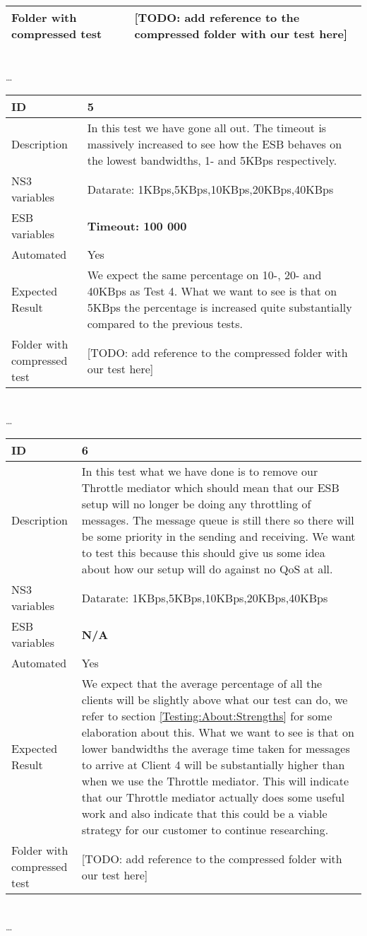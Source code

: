 \begin{center}
\begin{tabular}{| p{4cm} | p{8cm} |}
\hline
Folder with compressed test & [TODO: add reference to the compressed folder with our test here]\\
\hline
\end{tabular}
\\ \ldots \\
\begin{tabular}{| p{4cm} | p{8cm} |}%
\hline
ID & 5 \\
\hline
Description & In this test we have gone all out. The timeout is massively increased to see how the ESB behaves on the lowest bandwidths, 1- and 5KBps respectively.  \\
\hline
NS3 variables & Datarate: 1KBps,5KBps,10KBps,20KBps,40KBps \\
\hline
ESB variables & \textbf{Timeout: 100 000} \\
\hline
Automated & Yes \\
\hline
Expected Result & We expect the same percentage on 10-, 20- and 40KBps as Test 4. What we want to see is that on 5KBps the percentage is increased quite substantially compared to the previous tests. \\
\hline
Folder with compressed test & [TODO: add reference to the compressed folder with our test here]\\
\hline
\end{tabular}
\\ \ldots \\
\begin{tabular}{| p{4cm} | p{8cm} |}%
\hline
ID & 6 \\
\hline
Description & In this test what we have done is to remove our Throttle mediator which should mean that our ESB setup will no longer be doing any throttling of messages. The message queue is still there so there will be some priority in the sending and receiving. We want to test this because this should give us some idea about how our setup will do against no QoS at all. \\
\hline
NS3 variables & Datarate: 1KBps,5KBps,10KBps,20KBps,40KBps \\
\hline
ESB variables & \textbf{N/A} \\
\hline
Automated & Yes \\
\hline
Expected Result & We expect that the average percentage of all the clients will be slightly above what our test can do, we refer to section \ref{Testing:About:Strengths} for some elaboration about this. What we want to see is that on lower bandwidths the average time taken for messages to arrive at Client 4 will be substantially higher than when we use the Throttle mediator. This will indicate that our Throttle mediator actually does some useful work and also indicate that this could be a viable strategy for our customer to continue researching. \\
\hline
Folder with compressed test & [TODO: add reference to the compressed folder with our test here]\\
\hline
\end{tabular}
\\ \ldots \\
\end{center}
